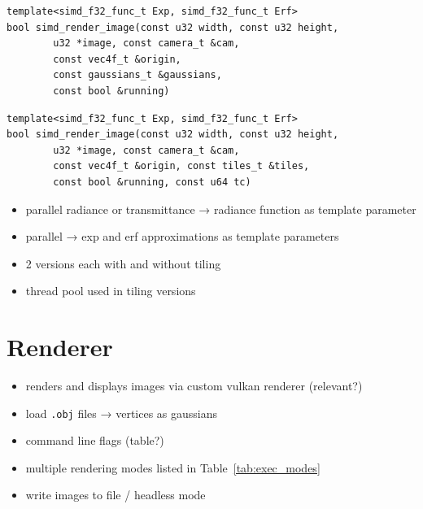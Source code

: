\documentclass[a4paper, 11pt]{memoir}
\begin{document}
    \begin{verbatim}
template<simd_f32_func_t Exp, simd_f32_func_t Erf>
bool simd_render_image(const u32 width, const u32 height,
        u32 *image, const camera_t &cam,
        const vec4f_t &origin,
        const gaussians_t &gaussians,
        const bool &running)
    \end{verbatim}

    \begin{verbatim}
template<simd_f32_func_t Exp, simd_f32_func_t Erf>
bool simd_render_image(const u32 width, const u32 height,
        u32 *image, const camera_t &cam,
        const vec4f_t &origin, const tiles_t &tiles,
        const bool &running, const u64 tc)
    \end{verbatim}

    \begin{itemize}
        \item parallel radiance or transmittance →  radiance function as template parameter
        \item parallel →  exp and erf approximations as template parameters
        \item 2 versions each with and without tiling
        \item thread pool used in tiling versions
    \end{itemize}

    \section{Renderer}
    \label{sec:renderer}

    \begin{itemize}
        \item renders and displays images via custom vulkan renderer (relevant?)
        \item load \texttt{.obj} files →  vertices as gaussians
        \item command line flags (table?)
        \item multiple rendering modes listed in Table~\ref{tab:exec_modes}
        \item write images to file / headless mode
    \end{itemize}
\end{document}
